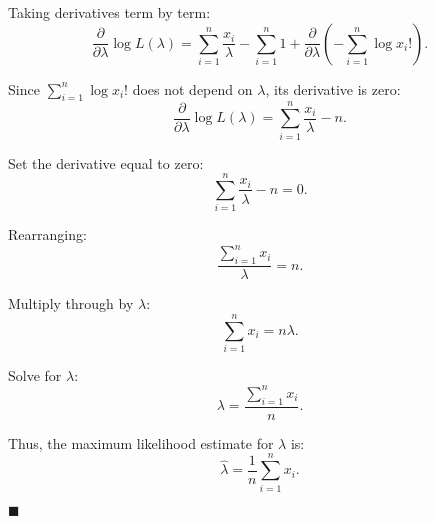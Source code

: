 \documentclass{article}
\begin{document}
Taking derivatives term by term:
\[
\frac{\partial}{\partial \lambda} \log L(\lambda) = \sum_{i=1}^n \frac{x_i}{\lambda} - \sum_{i=1}^n 1 + \frac{\partial}{\partial \lambda} \left( -\sum_{i=1}^n \log x_i! \right).
\]

Since \( \sum_{i=1}^n \log x_i! \) does not depend on \( \lambda \), its derivative is zero:
\[
\frac{\partial}{\partial \lambda} \log L(\lambda) = \sum_{i=1}^n \frac{x_i}{\lambda} - n.
\]

Set the derivative equal to zero:
\[
\sum_{i=1}^n \frac{x_i}{\lambda} - n = 0.
\]

Rearranging:
\[
\frac{\sum_{i=1}^n x_i}{\lambda} = n.
\]

Multiply through by \( \lambda \):
\[
\sum_{i=1}^n x_i = n\lambda.
\]

Solve for \( \lambda \):
\[
\lambda = \frac{\sum_{i=1}^n x_i}{n}.
\]

Thus, the maximum likelihood estimate for \( \lambda \) is:
\[
\hat{\lambda} = \frac{1}{n} \sum_{i=1}^n x_i.
\]

\hfill\(\blacksquare\)
\end{document}
